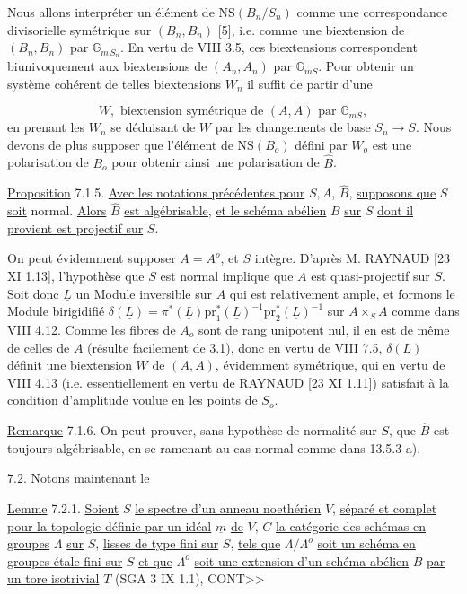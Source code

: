 Nous allons interpréter un élément de $\mathrm{NS}(B_n/S_n)$ comme une correspondance divisorielle symétrique sur $(B_n,B_n)$ [5], i.e. comme une biextension de $(B_n,B_n)$ par $\mathbb{G}_{m\,S_n}$. En vertu de VIII 3.5, ces biextensions correspondent biunivoquement aux biextensions de $(A_n,A_n)$ par $\mathbb{G}_{mS}$. Pour obtenir un système cohérent de telles biextensions $W_n$ il suffit de partir d'une

\begin{equation}\tag{7.1.4}
W, \text{ biextension symétrique de } (A,A) \text{ par } \mathbb{G}_{mS} ,
\end{equation}
en prenant les $W_n$ se déduisant de $W$ par les changements de base $S_n \longrightarrow S$. Nous devons de plus supposer que l'élément de $\mathrm{NS}(B_o)$ défini par $W_o$ est une polarisation de $B_o$ pour obtenir ainsi une polarisation de $\hat{B}$.



\underline{Proposition} 7.1.5. \underline{Avec les notations précédentes pour} $S,A$, $\hat{B}$, \underline{supposons que} $S$ \underline{soit} normal. \underline{Alors} $\hat{B}$ \underline{est algébrisable}, \underline{et le schéma abélien} $B$ \underline{sur} $S$ \underline{dont il provient est projectif sur} $S$.

On peut évidemment supposer $A=A^o$, et $S$ intègre. D'après M. RAYNAUD [23 XI 1.13], l'hypothèse que $S$ est normal implique que $A$ est quasi-projectif sur $S$. Soit donc $\underline{L}$ un Module inversible sur $A$ qui est relativement ample, et formons le Module birigidifié $\delta(\underline{L}) = \pi^*(\underline{L})\mathrm{pr}_1^*(\underline{L})^{-1}\mathrm{pr}_2^*(\underline{L})^{-1}$ sur $A\times_S A$ comme dans VIII 4.12. Comme les fibres de $A_o$ sont de rang unipotent nul, il en est de même de celles de $A$ (résulte facilement de 3.1), donc en vertu de VIII 7.5, $\delta(\underline{L})$ définit une biextension $W$ de $(A,A)$, évidemment symétrique, qui en vertu de VIII 4.13 (i.e. essentiellement en vertu de RAYNAUD [23 XI 1.11]) satisfait à la condition d'amplitude voulue en les points de $S_o$.

\underline{Remarque} 7.1.6. On peut prouver, sans hypothèse de normalité sur $S$, que $\hat{B}$ est toujours algébrisable, en se ramenant au cas normal comme dans 13.5.3 a).

7.2. Notons maintenant le

\underline{Lemme} 7.2.1. \underline{Soient} $S$ \underline{le spectre d'un anneau noethérien} $V$, \underline{séparé et complet pour la topologie définie par un idéal} $\underline{m}$ \underline{de} $V$, $C$ \underline{la catégorie des schémas en groupes} $\Lambda$ \underline{sur} $S$, \underline{lisses de type fini sur} $S$, \underline{tels que} $\Lambda/\Lambda^o$ \underline{soit un schéma en groupes étale fini sur} $S$ \underline{et que} $\Lambda^o$ \underline{soit une extension d'un schéma abélien} $B$ \underline{par un tore isotrivial} $T$ (SGA 3 IX 1.1), CONT>>


